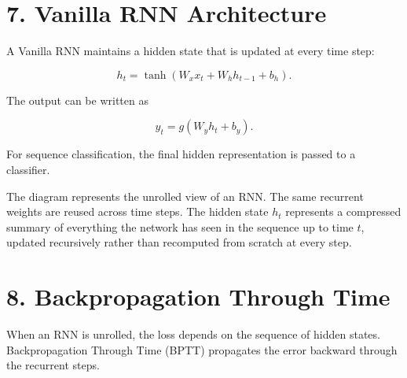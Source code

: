 \documentclass[10pt]{article}
\begin{document}
\section*{7. Vanilla RNN Architecture}

A Vanilla RNN maintains a hidden state that is updated at every time step:

\[
h_t=\tanh(W_xx_t+W_hh_{t-1}+b_h).
\]

The output can be written as

\[
y_t=g(W_yh_t+b_y).
\]

For sequence classification, the final hidden representation is passed to a
classifier.

\begin{center}
\end{center}

The diagram represents the unrolled view of an RNN. The same recurrent
weights are reused across time steps. The hidden state $h_t$ represents a
compressed summary of everything the network has seen in the sequence up to
time $t$, updated recursively rather than recomputed from scratch at every
step.

\section*{8. Backpropagation Through Time}

When an RNN is unrolled, the loss depends on the sequence of hidden states.
Backpropagation Through Time (BPTT) propagates the error backward through
the recurrent steps.

\begin{center}
\end{center}
\end{document}
